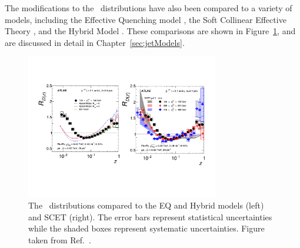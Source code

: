 The modifications to the \Dz\ distributions have also been compared to a variety of models, including the Effective Quenching model \cite{Spousta:2015fca}, the Soft Collinear Effective Theory \cite{Chien:2015vja, Kang:2017frl}, and the Hybrid Model \cite{Casalderrey-Solana:2014bpa}.
These comparisons are shown in Figure~\ref{fig:jetff_rdz_theory}, and are discussed in detail in Chapter~\ref{sec:jetModels}.

\begin{figure}[htbp]
\begin{center}
\includegraphics[width=0.75\textwidth]{figures/jetMeasurements/jetff_rdz_theory}
\caption{The \Rdz\ distributions compared to the EQ and Hybrid models (left) and SCET (right).
The error bars represent statistical uncertainties while the shaded boxes represent systematic uncertainties.
Figure taken from Ref.~\cite{PhysRevC.98.024908}.}
\label{fig:jetff_rdz_theory}
\end{center}
\end{figure}



